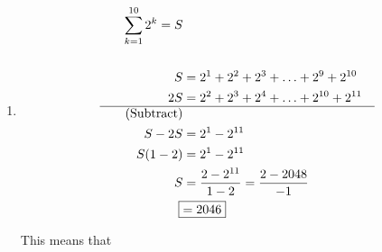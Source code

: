 \documentclass[../../Main.tex]{subfiles}
\begin{document}
\begin{example}
\begin{enumerate}
\begin{theorem}
            \begin{align*}
                \sum_{k = m}^{n} a_k = \sum_{k = 1}^{n} a_k - \sum_{k = 1}^{m - 1} a_k 
            \end{align*}

            Where $f(k)$ is a function like $k^2$ that has it's own formula for the sum like

            \begin{align*}
                \sum_{k = 1}^{n} f(k) = \sum_{k = 1}^{n} k^2 = \frac{n(n + 1)(2n + 1)}{6} \\    
            \end{align*}

            Using this on the other example,

            \begin{align*}
                \sum_{k = 1}^{200} (k + 1)^2 &= \sum_{k = 1}^{201} k^2 - \sum_{k = 1}^{1} k^2  \\
                &= \frac{201(202)(403)}{2} - \frac{1(2)(1)}{2} \\
                &= 2727101 - 1 \\
                \Aboxed{&= 2727100} \tag{Use Calculator} \\ 
            \end{align*}

        \end{theorem}

        \item 
            \begin{align*}
                \sum_{k = 1}^{10} 2^k = S \\
                \\
                S &= 2^1 + 2^2 + 2^3 + \ldots + 2^9 + 2^{10} \\
                2S &= 2^2 + 2^3 + 2^4 + \ldots + 2^{10} + 2^{11} \\
                \hline \tag{Subtract} \\
                S - 2S &= 2^1 - 2^{11} \\
                S(1 - 2) &= 2^1 - 2^{11} \\
                S &= \frac{2 - 2^{11}}{1 - 2} = \frac{2 - 2048}{-1} \\
                \Aboxed{&= 2046} \\ 
            \end{align*}

        \begin{note}
            This means that


\end{note}
\end{enumerate}
\end{example}
\end{document}
